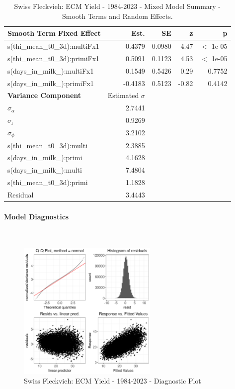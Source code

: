 \newpage
\begin{table}[H]
\centering
\begin{tabular}
{l | r | r | r | r}
\textbf{Smooth Term Fixed Effect} & Est. & SE & z & p\\
\hline
\hline
s(thi\_mean\_t0\_3d):multiFx1 & 0.4379 & 0.0980 & 4.47 & $<$ 1e-05\\
s(thi\_mean\_t0\_3d):primiFx1 & 0.5091 & 0.1123 & 4.53 & $<$ 1e-05\\
s(days\_in\_milk\_):multiFx1 & 0.1549 & 0.5426 & 0.29 & 0.7752\\
s(days\_in\_milk\_):primiFx1 & -0.4183 & 0.5123 & -0.82 & 0.4142\\
\hline
\textbf{Variance Component} & Estimated $\sigma$ & & & \\
\hline
\hline
$\sigma_\alpha$ & 2.7441 & & & \\
$\sigma_\iota$ & 0.9269 & & & \\
$\sigma_\phi$ & 3.2102 & & & \\
s(thi\_mean\_t0\_3d):multi &  2.3885 & & & \\
s(days\_in\_milk\_):primi & 4.1628 & & & \\
s(days\_in\_milk\_):multi & 7.4804 & & & \\
s(thi\_mean\_t0\_3d):primi & 1.1828 & & & \\
Residual & 3.4443 & & & \\
\end{tabular}
\caption[]{Swiss Fleckvieh: ECM Yield - 1984-2023 - Mixed Model Summary - Smooth Terms and Random Effects.}
\end{table}


\paragraph{Model Diagnostics} \quad \\
\begin{figure}[H]
    \centering
    \includegraphics[width=0.6\textwidth]{thesis/figures/models/ecm/full/sf_ecm_full/sf_ecm_full_diagnostics.png}
    \caption[]{Swiss Fleckvieh: ECM Yield - 1984-2023 - Diagnostic Plot}
\end{figure}

